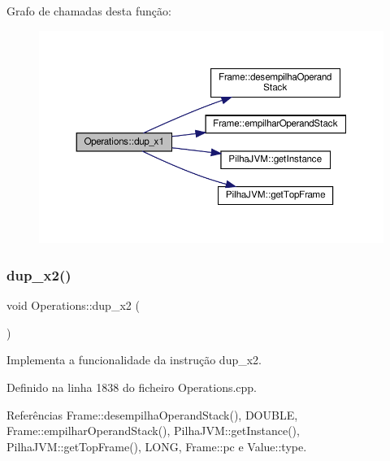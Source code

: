 Grafo de chamadas desta função\+:
\nopagebreak
\begin{figure}[H]
\begin{center}
\leavevmode
\includegraphics[width=350pt]{classOperations_a46bab81a4a4bd1eda1c89b0b74f9e014_cgraph}
\end{center}
\end{figure}
\mbox{\label{classOperations_adbba871c60bfb34344f2012936beeb25}} 
\subsubsection{\texorpdfstring{dup\+\_\+x2()}{dup\_x2()}}
{\footnotesize\ttfamily void Operations\+::dup\+\_\+x2 (\begin{DoxyParamCaption}{ }\end{DoxyParamCaption})\hspace{0.3cm}{\ttfamily [private]}}



Implementa a funcionalidade da instrução dup\+\_\+x2. 



Definido na linha 1838 do ficheiro Operations.\+cpp.



Referências Frame\+::desempilha\+Operand\+Stack(), D\+O\+U\+B\+LE, Frame\+::empilhar\+Operand\+Stack(), Pilha\+J\+V\+M\+::get\+Instance(), Pilha\+J\+V\+M\+::get\+Top\+Frame(), L\+O\+NG, Frame\+::pc e Value\+::type.

